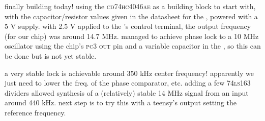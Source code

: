 finally building today! using the \textsc{cd74hc4046ae} as a \pll building
block to start with, with the capacitor/resistor values given in the datasheet
for the \vco, powered with a 5 V supply. with 2.5 V applied to the \vco's
control terminal, the output frequency (for our chip) was around 14.7 MHz.
managed to achieve phase lock to a 10 MHz oscillator using the chip's
\textsc{pc3 out} pin and a variable capacitor in the \vco, so this can be done
but is not yet stable.

a very stable lock is achievable around 350 kHz center frequency! apparently we
just need to lower the freq. of the phase comparator, etc. adding a few
\textsc{74ls163} dividers allowed synthesis of a (relatively) stable 14 MHz
signal from an input around 440 kHz. next step is to try this \pll with a
teensy's \pwm output setting the reference frequency.
